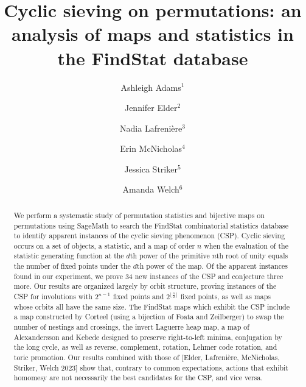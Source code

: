 \documentclass{amsart}
\title[Cyclic Sieving on Permutations]{Cyclic sieving on permutations: an analysis of maps and statistics in the FindStat database}
\author[1]{Ashleigh Adams$^1$}
\author[2]{Jennifer Elder$^2$}
\author[3]{Nadia Lafreni\`ere$^3$}
\author[4]{Erin McNicholas$^4$}
\author[5]{Jessica Striker$^5$}
\author[6]{Amanda Welch$^6$}
\theoremstyle{definition}
\begin{document}
\begin{abstract}
  We perform a systematic study of permutation statistics and bijective maps on permutations using SageMath to search the FindStat combinatorial statistics database to identify apparent instances of the cyclic sieving phenomenon (CSP). Cyclic sieving occurs on a set of objects, a statistic, and a map of order $n$ when the evaluation of the statistic generating function at the $d$th power of the primitive $n$th root of unity equals the number of fixed points under the $d$th power of the map. Of the apparent instances found in our experiment, we prove 34 new instances of the CSP and conjecture three more. 
Our results are organized largely by orbit structure, proving instances of the CSP for involutions with $2^{n-1}$ fixed points and $2^{\lfloor\frac{n}{2}\rfloor}$ fixed points, as well as maps whose orbits all have the same size.  The FindStat maps which exhibit the CSP include a map constructed by Corteel (using a bijection of Foata and Zeilberger) to swap the number of nestings and crossings, the invert Laguerre heap map, a map of Alexandersson and Kebede designed to preserve right-to-left minima, conjugation by the long cycle, as well as reverse, complement, rotation, Lehmer code rotation, and toric promotion.  Our results combined with those of [Elder, Lafreni\`ere, McNicholas, Striker, Welch 2023] show that, contrary to common expectations, actions that exhibit homomesy are not necessarily the best candidates for the CSP, and vice versa.
\end{abstract}


    

\maketitle


\end{document}

